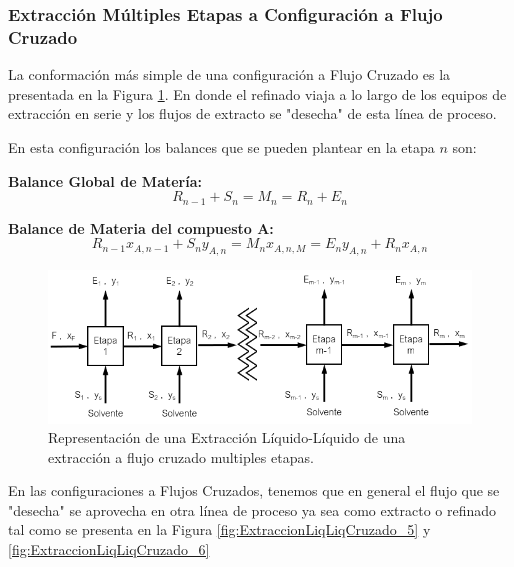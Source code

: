 \documentclass[11pt]{book}
\begin{document}
\subsubsection{Extracción Múltiples Etapas a Configuración a Flujo Cruzado}

La conformación más simple de una configuración a Flujo Cruzado es la presentada en la Figura \ref{fig:ExtraccionLiqLiqCruzado_4}. En donde el refinado viaja a lo largo de los equipos de extracción en serie y los flujos de extracto se "desecha" de esta línea de proceso. 

En esta configuración los balances que se pueden plantear en la etapa $n$ son:

\textbf{Balance Global de Matería:}
\begin{equation}
    \label{eq:ExtraccionLiqLiqCruzado_5}
    R_{n-1} + S_n = M_n = R_n + E_n
\end{equation}

\textbf{Balance de Materia del compuesto A:}
\begin{equation}
    \label{eq:ExtraccionLiqLiqCruzado_6}
   R_{n-1} x_{A,n-1} + S_n y_{A,n} = M_n x_{A,n,M} = E_n y_{A,n} + R_n x_{A,n}
\end{equation}

\begin{figure}[H]
    \centering
    \includegraphics{img/LiquidoLiquido/ExtracionLiqLiqCruzado_4.PNG}
    \caption{Representación de una Extracción Líquido-Líquido de una extracción a flujo cruzado multiples etapas.}
    \label{fig:ExtraccionLiqLiqCruzado_4}
\end{figure}

En las configuraciones a Flujos Cruzados, tenemos que en general el flujo que se "desecha" se aprovecha en otra línea de proceso ya sea como extracto o refinado tal como se presenta en la Figura \ref{fig:ExtraccionLiqLiqCruzado_5} y \ref{fig:ExtraccionLiqLiqCruzado_6}
\end{document}
